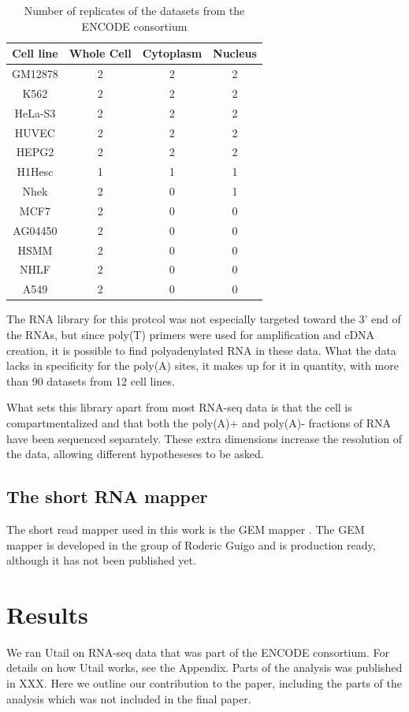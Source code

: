 \begin{table}
	\centering
	\begin{tabular}{cccc}
	  Cell line & Whole Cell & Cytoplasm & Nucleus \\
	  \midrule
	  GM12878 & 2 & 2 & 2 \\
	  K562 & 2 & 2 & 2 \\
	  HeLa-S3 & 2 & 2 & 2 \\
	  HUVEC & 2 & 2 & 2 \\
	  HEPG2 & 2 & 2 & 2 \\
	  H1Hesc & 1 & 1 & 1 \\
	  Nhek & 2 & 0 & 1 \\
	  MCF7 & 2 & 0 & 0 \\
	  AG04450 & 2 & 0 & 0 \\
	  HSMM & 2 & 0 & 0 \\
	  NHLF & 2 & 0 & 0 \\
	  A549 & 2 & 0 & 0 \\
	\end{tabular}
	\caption{Number of replicates of the datasets from the ENCODE consortium}
	\label{tab:Datasets}
\end{table}

The RNA library for this protcol was not especially targeted toward the 3' end
of the RNAs, but since poly(T) primers were used for amplification and cDNA
creation, it is possible to find polyadenylated RNA in these data. What the
data lacks in specificity for the poly(A) sites, it makes up for it in
quantity, with more than 90 datasets from 12 cell lines.

What sets this library apart from most RNA-seq data is that the cell is
compartmentalized and that both the poly(A)+ and poly(A)- fractions of RNA have
been sequenced separately. These extra dimensions increase the resolution of
the data, allowing different hypotheseses to be asked.

\subsection{The short RNA mapper}
The short read mapper used in this work is the GEM mapper
\cite{ribeca_gem_2010}. The GEM mapper is developed in the group of Roderic
Guigo and is production ready, although it has not been published yet.

\section{Results}
We ran Utail on RNA-seq data that was part of the ENCODE consortium. For
details on how Utail works, see the Appendix. Parts of the analysis was
published in XXX. Here we outline our contribution to the paper, including the
parts of the analysis which was not included in the final paper.

